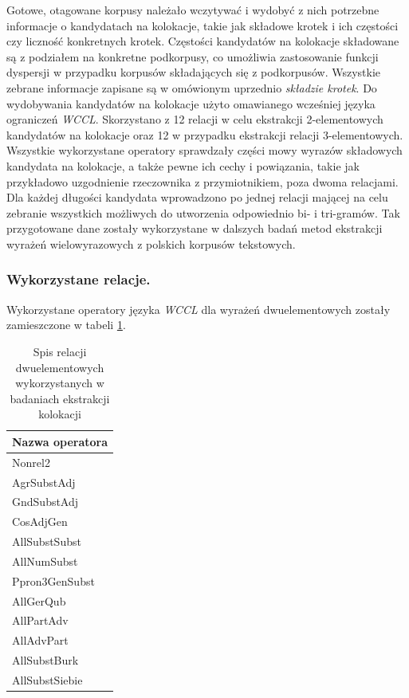 \documentclass[11pt,a4paper]{llncs}
\begin{document}
Gotowe, otagowane korpusy należało wczytywać i wydobyć z nich potrzebne informacje o kandydatach na kolokacje, takie jak składowe krotek i ich częstości czy liczność konkretnych krotek.
Częstości kandydatów na kolokacje składowane są z podziałem na konkretne podkorpusy, co umożliwia zastosowanie funkcji dyspersji w przypadku korpusów składających się z podkorpusów.
Wszystkie zebrane informacje zapisane są w omówionym uprzednio \emph{składzie krotek}.
Do wydobywania kandydatów na kolokacje użyto omawianego wcześniej języka ograniczeń \emph{WCCL}.
Skorzystano z 12 relacji w celu ekstrakcji 2-elementowych kandydatów na kolokacje oraz 12 w przypadku ekstrakcji relacji 3-elementowych.
Wszystkie wykorzystane operatory sprawdzały części mowy wyrazów składowych kandydata na kolokacje, a także pewne ich cechy i powiązania, takie jak przykładowo uzgodnienie rzeczownika z przymiotnikiem, poza dwoma relacjami.
Dla każdej długości kandydata wprowadzono po jednej relacji mającej na celu zebranie wszystkich możliwych do utworzenia odpowiednio bi- i tri-gramów.
Tak przygotowane dane zostały wykorzystane w dalszych badań metod ekstrakcji wyrażeń wielowyrazowych z polskich korpusów tekstowych.

\subsubsection{Wykorzystane relacje.}

Wykorzystane operatory języka \emph{WCCL} dla wyrażeń dwuelementowych zostały zamieszczone w tabeli \ref{relations_2}.
\begin{table}[h!]
\centering
\begin{tabular}{l}
	\toprule
	Nazwa operatora \\
	\midrule
	Nonrel2\\
	AgrSubstAdj\\
	GndSubstAdj\\
	CosAdjGen\\
	AllSubstSubst\\
	AllNumSubst\\
	Ppron3GenSubst\\
	AllGerQub\\
	AllPartAdv\\
	AllAdvPart\\
	AllSubstBurk\\
	AllSubstSiebie\\
	\bottomrule
\end{tabular}
\caption[Relacje dwuelementowe wykorzystane w badaniach]{Spis relacji dwuelementowych wykorzystanych w badaniach ekstrakcji kolokacji}
\label{relations_2}
\end{table}
\end{document}
